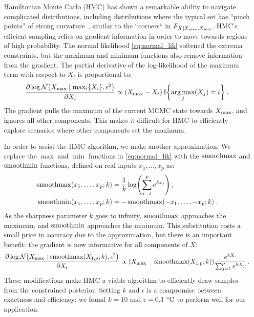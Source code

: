 Hamiltonian Monte Carlo (HMC) has shown a remarkable ability to navigate complicated distributions, including distributions where the typical set has ``pinch points'' of strong
curvature~\citep{betancourt2017conceptual}, similar to the ``corners`` in \(F_{X \mid X_{\max},X_{\min}}\).
HMC's efficient sampling relies on gradient information in order to move towards regions of high probability.
The normal likelihood \autoref{eq:normal_lik} softened the extrema constraints,
but the maximum and minimum functions also remove information from the gradient.
The partial derivative of the log-likelihood of the maximum term with respect to \(X_i\) is proportional to:
\begin{equation}
\frac{\partial \log \normal\del{\Xmax \mid \max_i\cbr{X_i}, \epsilon^2}}{\partial X_i} \propto \del{\Xmax - X_i} \Ind\cbr{\argmax_j\del{X_j} = i} \,.
\end{equation}
The gradient pulls the maximum of the current MCMC state towards \(X_{\max}\),
and ignores all other components.
This makes it difficult for HMC to efficiently explore scenarios where other components set the maximum.

In order to assist the HMC algorithm, we make another approximation.
We replace the \(\max\) and \(\min\) functions in \autoref{eq:normal_lik} with the \(\operatorname*{smoothmax}\) and \(\operatorname*{smoothmin}\) functions, defined on real inputs \(x_1, \dotsc, x_p\) as:
\begin{equation}
\begin{split}
    \softmax\del{x_1, \dotsc, x_p ; k} &= \frac{1}{k} \log\del{\sum_{i=1}^p e^{kx_i}}\,, \\
    \softmin\del{x_1, \dotsc, x_p ; k} &= -\softmax\del{-x_1, \dotsc, -x_p; k}\,.
\end{split}
\label{eq:softmax}
\end{equation}
As the sharpness parameter \(k\) goes to infinity, \(\operatorname*{smoothmax}\) approaches the maximum, and \(\operatorname*{smoothmin}\) approaches the minimum.
This substitution costs a small price in accuracy due to the approximation, but there is an important benefit: the gradient is now informative for all components of \(X\):
\begin{equation}
\frac{\partial \log \normal\del{\Xmax \mid \softmax\del{X_{1:p} ; k}, \epsilon^2}}{\partial X_i} \propto \del{\Xmax - \softmax\del{X_{1:p} ; k}} 
        \frac{e^{k X_i}}
             {\sum_{j=1}^p e^{k X_j}} \,.
\end{equation}
These modifications make HMC a viable algorithm to efficiently draw samples from the constrained posterior.
Setting \(k\) and \(\epsilon\) is a compromise between exactness and efficiency;
we found \(k=10\) and \(\epsilon=0.1\,{\,^\circ}{}\mathrm{C}\) to perform well for our application.


